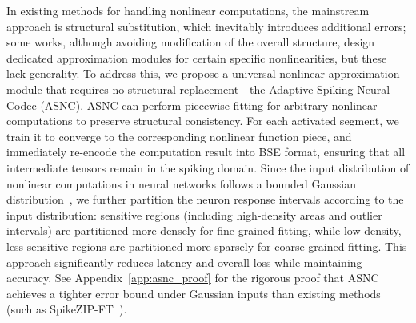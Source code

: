 \documentclass{article}
\theoremstyle{plain}
\theoremstyle{definition}
\theoremstyle{remark}
\begin{document}
In existing methods for handling nonlinear computations, the mainstream approach is structural substitution, which inevitably introduces additional errors; some works, although avoiding modification of the overall structure, design dedicated approximation modules for certain specific nonlinearities, but these lack generality. To address this, we propose a universal nonlinear approximation module that requires no structural replacement—the Adaptive Spiking Neural Codec (ASNC). ASNC can perform piecewise fitting for arbitrary nonlinear computations to preserve structural consistency. For each activated segment, we train it to converge to the corresponding nonlinear function piece, and immediately re-encode the computation result into BSE format, ensuring that all intermediate tensors remain in the spiking domain. Since the input distribution of nonlinear computations in neural networks follows a bounded Gaussian distribution~\citep{he2024understanding,lin2024duquant}, we further partition the neuron response intervals according to the input distribution: sensitive regions (including high-density areas and outlier intervals) are partitioned more densely for fine-grained fitting, while low-density, less-sensitive regions are partitioned more sparsely for coarse-grained fitting. This approach significantly reduces latency and overall loss while maintaining accuracy. See Appendix~\ref{app:asnc_proof} for the rigorous proof that ASNC achieves a tighter error bound under Gaussian inputs than existing methods (such as SpikeZIP-FT~\citep{you2024spikeziptf}).
\end{document}
